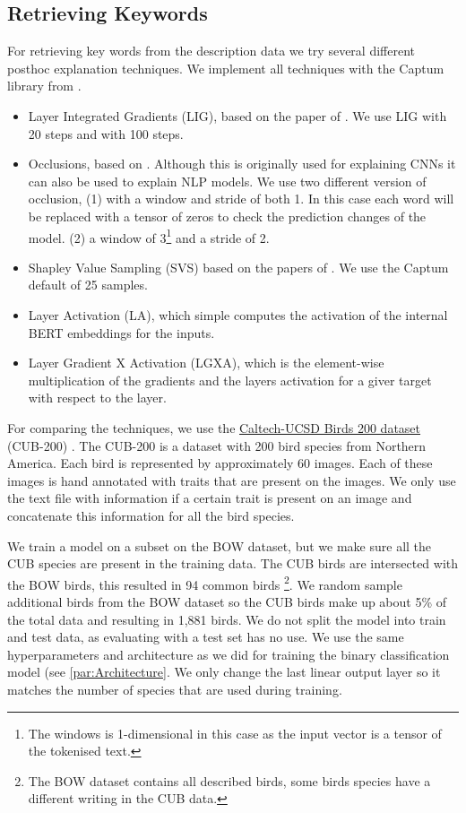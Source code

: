 \documentclass[a4paper, 12pt, oneside]{book} %
\begin{document}
\subsection{Retrieving Keywords} \label{par:keywords}
For retrieving key words from the description data we try several different posthoc explanation techniques. We implement all techniques with the Captum library from \textcite{kokhlikyan_captum_2020}.
\begin{itemize}
    \item Layer Integrated Gradients (LIG), based on the paper of \textcite{sundararajan_axiomatic_2017}. We use LIG with 20 steps and with 100 steps.
    \item Occlusions, based on \textcite{fleet_visualizing_2014}. Although this is originally used for explaining CNNs it can also be used to explain NLP models. We use two different version of occlusion, (1) with a window and stride of both 1. In this case each word will be replaced with a tensor of zeros to check the prediction changes of the model. (2) a window of 3\footnote{The windows is 1-dimensional in this case as the input vector is a tensor of the tokenised text.} and a stride of 2.
    \item Shapley Value Sampling (SVS) based on the papers of \textcite{castro_polynomial_2009, strumbelj_efficient_2010}. We use the Captum default of 25 samples.
    \item Layer Activation (LA), which simple computes the activation of the internal BERT embeddings for the inputs.
    \item Layer Gradient X Activation (LGXA), which is the element-wise multiplication of the gradients and the layers activation for a giver target with respect to the layer.
\end{itemize}

For comparing the techniques, we use the \href{http://www.vision.caltech.edu/visipedia/CUB-200-2011.html}{Caltech-UCSD Birds 200 dataset} (CUB-200) \autocite{welinder_caltech-ucsd_2010}.
The CUB-200 is a dataset with 200 bird species from Northern America.
Each bird is represented by approximately 60 images. 
Each of these images is hand annotated with traits that are present on the images.
We only use the text file with information if a certain trait is present on an image and concatenate this information for all the bird species.

We train a model on a subset on the BOW dataset, but we make sure all the CUB species are present in the training data.
The CUB birds are intersected with the BOW birds, this resulted in 94 common birds \footnote{The BOW dataset contains all described birds, some birds species have a different writing in the CUB data.}.
We random sample additional birds from the BOW dataset so the CUB birds make up about 5\% of the total data and resulting in 1,881 birds.
We do not split the model into train and test data, as evaluating with a test set has no use.
We use the same hyperparameters and architecture as we did for training the binary classification model (see \ref{par:Architecture}.
We only change the last linear output layer so it matches the number of species that are used during training.
\end{document}
